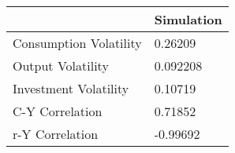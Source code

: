 \begin{tabular}{ll}
& Simulation \\ 
\hline 
Consumption Volatility & 0.26209 \\ 
Output Volatility & 0.092208 \\ 
Investment Volatility & 0.10719 \\ 
C-Y Correlation & 0.71852 \\ 
r-Y Correlation & -0.99692 \\ 
\hline 
\end{tabular}
